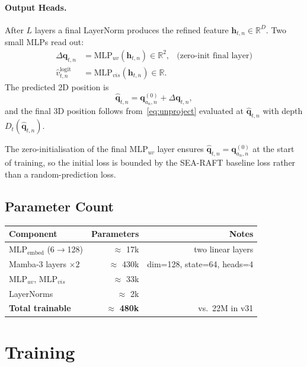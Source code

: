 \documentclass[11pt,a4paper]{article}
\begin{document}
\paragraph{Output Heads.}
After $L$ layers a final LayerNorm produces the refined feature
$\bm{h}_{t,n} \in \mathbb{R}^D$. Two small MLPs read out:
\begin{align}
  \Delta\bm{q}_{t,n} &= \mathrm{MLP}_{uv}(\bm{h}_{t,n}) \in \mathbb{R}^2,
  & \text{(zero-init final layer)} \\
  \hat{v}_{t,n}^{\text{logit}} &= \mathrm{MLP}_{vis}(\bm{h}_{t,n}) \in \mathbb{R}.
\end{align}
The predicted 2D position is
\begin{equation}
  \hat{\bm{q}}_{t,n} = \bm{q}_{a_n,n}^{(0)} + \Delta\bm{q}_{t,n},
\end{equation}
and the final 3D position follows from~\eqref{eq:unproject}
evaluated at $\hat{\bm{q}}_{t,n}$ with depth $D_t(\hat{\bm{q}}_{t,n})$.

The zero-initialisation of the final $\mathrm{MLP}_{uv}$ layer ensures
$\hat{\bm{q}}_{t,n} = \bm{q}_{a_n,n}^{(0)}$ at the start of training,
so the initial loss is bounded by the SEA-RAFT baseline loss rather
than a random-prediction loss.

\subsection{Parameter Count}

\begin{center}
\begin{tabular}{lrr}
\toprule
Component & Parameters & Notes \\
\midrule
$\mathrm{MLP}_\mathrm{embed}$ (6$\to$128)   & $\approx$ 17k & two linear layers \\
Mamba-3 layers $\times 2$  & $\approx$ 430k & dim=128, state=64, heads=4 \\
$\mathrm{MLP}_{uv}$, $\mathrm{MLP}_{vis}$ & $\approx$ 33k & \\
LayerNorms             & $\approx$ 2k & \\
\midrule
\textbf{Total trainable} & $\approx$ \textbf{480k} & vs.\ 22M in v31 \\
\bottomrule
\end{tabular}
\end{center}

\section{Training}
\end{document}
